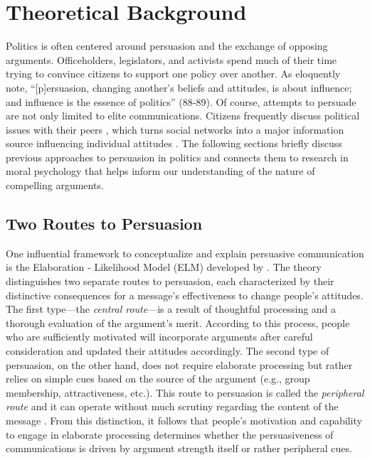 


\section{Theoretical Background}

Politics is often centered around persuasion and the exchange of opposing arguments. Officeholders, legislators, and activists spend much of their time trying to convince citizens to support one policy over another. As \citet{cobb1997changing} eloquently note, ``[p]ersuasion, changing another's beliefs and attitudes, is about influence; and influence is the essence of politics'' (88-89). Of course, attempts to persuade are not only limited to elite communications. Citizens frequently discuss political issues with their peers \citep{huckfeldt1995political}, which turns social networks into a major information source influencing individual attitudes \citep[e.g.,][]{ahn2010communication,lazer2010coevolution}. The following sections briefly discuss previous approaches to persuasion in politics and connects them to research in moral psychology that helps inform our understanding of the nature of compelling arguments.



\subsection{Two Routes to Persuasion}

One influential framework to conceptualize and explain persuasive communication is the Elaboration - Likelihood Model (ELM) developed by \citet{petty1986communication,petty1986elaboration}. The theory distinguishes two separate routes to persuasion, each characterized by their distinctive consequences for a message's effectiveness to change people's attitudes. The first type---the \textit{central route}---is a result of thoughtful processing and a thorough evaluation of the argument's merit. According to this process, people who are sufficiently motivated will incorporate arguments after careful consideration and updated their attitudes accordingly. The second type of persuasion, on the other hand, does not require elaborate processing but rather relies on simple cues based on the source of the argument (e.g., group membership, attractiveness, etc.). This route to persuasion is called the \textit{peripheral route} and it can operate without much scrutiny regarding the content of the message \citep[see also][for a similar distinction between systematic and heuristic processing]{chaiken1989heuristic}. From this distinction, it follows that people's motivation and capability to engage in elaborate processing determines whether the persuasiveness of communications is driven by argument strength itself or rather peripheral cues.

